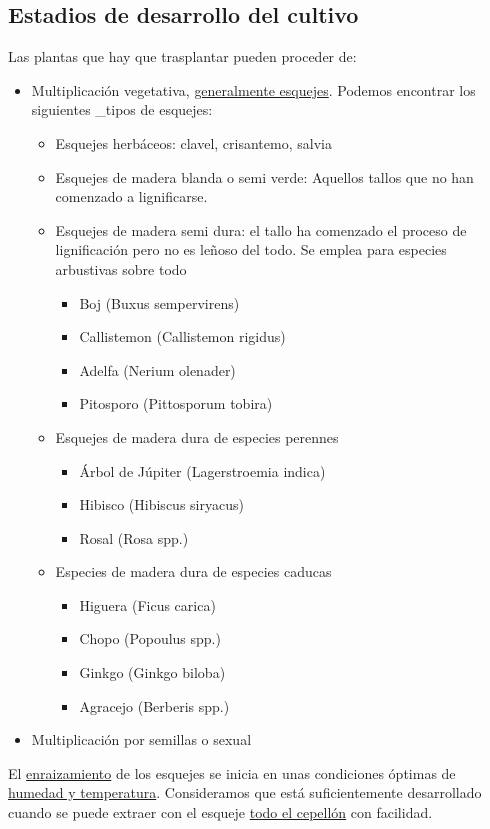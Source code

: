 \documentclass[a4paper,12pt,oneside]{article}
\begin{document}
\subsection{Estadios de desarrollo del cultivo}
\label{sec:org42c0af3}
Las plantas que hay que trasplantar pueden proceder de:
\begin{itemize}
\item Multiplicación vegetativa, \uline{generalmente esquejes}. Podemos encontrar los
siguientes \_tipos de esquejes:
\begin{itemize}
\item Esquejes herbáceos: clavel, crisantemo, salvia
\item Esquejes de madera blanda o semi verde: Aquellos tallos que no han comenzado
a lignificarse.
\item Esquejes de madera semi dura: el tallo ha comenzado el proceso de
lignificación pero no es leñoso del todo. Se emplea para especies arbustivas
sobre todo
\begin{itemize}
\item Boj (Buxus sempervirens)
\item Callistemon (Callistemon rigidus)
\item Adelfa (Nerium olenader)
\item Pitosporo (Pittosporum tobira)
\end{itemize}
\item Esquejes de madera dura de especies perennes
\begin{itemize}
\item Árbol de Júpiter (Lagerstroemia indica)
\item Hibisco (Hibiscus siryacus)
\item Rosal (Rosa spp.)
\end{itemize}
\item Especies de madera dura de especies caducas
\begin{itemize}
\item Higuera (Ficus carica)
\item Chopo (Popoulus spp.)
\item Ginkgo (Ginkgo biloba)
\item Agracejo (Berberis spp.)
\end{itemize}
\end{itemize}
\item Multiplicación por semillas o sexual
\end{itemize}

El \uline{enraizamiento} de los esquejes se inicia en unas condiciones óptimas de
\uline{humedad y temperatura}. Consideramos que está suficientemente desarrollado
cuando se puede extraer con el esqueje \uline{todo el cepellón} con facilidad.
\end{document}
